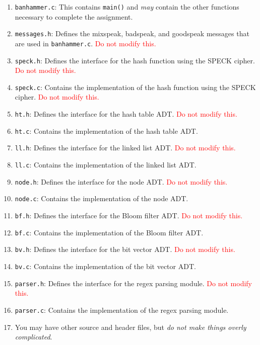 \documentclass{article}
\begin{document}
\begin{enumerate}
  \item \texttt{banhammer.c}: This contains \texttt{main()} and
    \emph{may} contain the other functions necessary to complete the
    assignment.
  \item \texttt{messages.h}: Defines the mixspeak, badspeak, and
    goodspeak messages that are used in \texttt{banhammer.c}.
    \textcolor{red}{Do not modify this.}
  \item \texttt{speck.h}: Defines the interface for the hash function
    using the SPECK cipher. \textcolor{red}{Do not modify this.}
  \item \texttt{speck.c}: Contains the implementation of the hash
    function using the SPECK cipher. \textcolor{red}{Do not modify this.}
  \item \texttt{ht.h}: Defines the interface for the hash table ADT.
    \textcolor{red}{Do not modify this.}
  \item \texttt{ht.c}: Contains the implementation of the hash table
    ADT.
  \item \texttt{ll.h}: Defines the interface for the linked list ADT.
    \textcolor{red}{Do not modify this.}
  \item \texttt{ll.c}: Contains the implementation of the linked list
    ADT.
  \item \texttt{node.h}: Defines the interface for the node ADT.
    \textcolor{red}{Do not modify this.}
  \item \texttt{node.c}: Contains the implementation of the node ADT.
  \item \texttt{bf.h}: Defines the interface for the Bloom filter ADT.
    \textcolor{red}{Do not modify this.}
  \item \texttt{bf.c}: Contains the implementation of the Bloom filter ADT.
  \item \texttt{bv.h}: Defines the interface for the bit vector ADT.
    \textcolor{red}{Do not modify this.}
  \item \texttt{bv.c}: Contains the implementation of the bit vector
    ADT.
  \item \texttt{parser.h}: Defines the interface for the regex parsing
    module. \textcolor{red}{Do not modify this.}
  \item \texttt{parser.c}: Contains the implementation of the regex
    parsing module.
  \item You may have other source and header files, but \emph{do not
    make things overly complicated}.


\end{enumerate}
\end{document}
